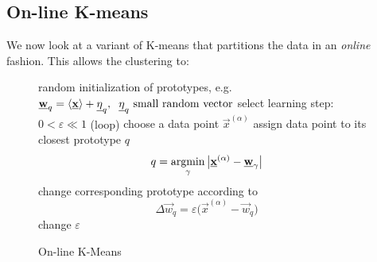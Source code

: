 \begin{frame}
\section{On-line K-means}

We now look at a variant of K-means that partitions the data in an \emph{online} fashion. This allows the clustering to:

\begin{figure}[!th]
\footnotesize
\removelatexerror
\begin{algorithm}[H]
  \DontPrintSemicolon
   random initialization of prototypes, e.g.\ $\vec{w}_{q} = \langle  \vec{x} \rangle +\vec{\eta}_{q},\hspace{0.2cm} \vec{\eta}_{q}  \text{ small random vector}$\;
  select learning step:   $0 < \varepsilon  \ll 1$\;
  \Begin(loop){
    choose a data point $\vec{x}^{(\alpha)}$ \;
    assign data point to its closest prototype $q$\;
    \[ q = \argmin_{\gamma} \big| \vec{x}^{(\alpha)} - \vec{w}_{\gamma} \big| \]
    change corresponding prototype according to\;
    \[ \Delta \vec{w}_q = \varepsilon \big( \vec{x}^{(\alpha)} - \vec{w}_{q} \big) \]
    change $\varepsilon$ \;
  }
  \label{alg:on-line-k-means}
  \caption{On-line K-Means}
\end{algorithm}
\end{figure}

\end{frame}

